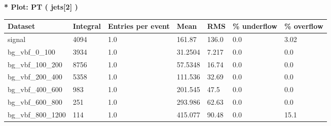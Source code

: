 \documentclass[a4paper, 10pt]{article}
\begin{document}
\textbf{* Plot: PT ( jets[2] ) }\\
   \begin{table}[H]
  \begin{center}
    \begin{tabular}{|m{23.0mm}|m{23.0mm}|m{18.0mm}|m{19.0mm}|m{19.0mm}|m{19.0mm}|m{19.0mm}|}
      \hline
      {\cellcolor{yellow}         Dataset}& {\cellcolor{yellow}         Integral}& {\cellcolor{yellow}         Entries per event}& {\cellcolor{yellow}         Mean}& {\cellcolor{yellow}         RMS}& {\cellcolor{yellow}         \% underflow}& {\cellcolor{yellow}         \% overflow}\\
      \hline
      {\cellcolor{white}         signal}& {\cellcolor{white}         4094}& {\cellcolor{white}         1.0}& {\cellcolor{white}         161.87}& {\cellcolor{white}         136.0}& {\cellcolor{green}         0.0}& {\cellcolor{green}         3.02}\\
      \hline
      {\cellcolor{white}         bg\_vbf\_0\_100}& {\cellcolor{white}         3934}& {\cellcolor{white}         1.0}& {\cellcolor{white}         31.2504}& {\cellcolor{white}         7.217}& {\cellcolor{green}         0.0}& {\cellcolor{green}         0.0}\\
      \hline
      {\cellcolor{white}         bg\_vbf\_100\_200}& {\cellcolor{white}         8756}& {\cellcolor{white}         1.0}& {\cellcolor{white}         57.5348}& {\cellcolor{white}         16.74}& {\cellcolor{green}         0.0}& {\cellcolor{green}         0.0}\\
      \hline
      {\cellcolor{white}         bg\_vbf\_200\_400}& {\cellcolor{white}         5358}& {\cellcolor{white}         1.0}& {\cellcolor{white}         111.536}& {\cellcolor{white}         32.69}& {\cellcolor{green}         0.0}& {\cellcolor{green}         0.0}\\
      \hline
      {\cellcolor{white}         bg\_vbf\_400\_600}& {\cellcolor{white}         983}& {\cellcolor{white}         1.0}& {\cellcolor{white}         201.545}& {\cellcolor{white}         47.5}& {\cellcolor{green}         0.0}& {\cellcolor{green}         0.0}\\
      \hline
      {\cellcolor{white}         bg\_vbf\_600\_800}& {\cellcolor{white}         251}& {\cellcolor{white}         1.0}& {\cellcolor{white}         293.986}& {\cellcolor{white}         62.63}& {\cellcolor{green}         0.0}& {\cellcolor{green}         0.0}\\
      \hline
      {\cellcolor{white}         bg\_vbf\_800\_1200}& {\cellcolor{white}         114}& {\cellcolor{white}         1.0}& {\cellcolor{white}         415.077}& {\cellcolor{white}         90.48}& {\cellcolor{red}         0.0}& {\cellcolor{red}         15.1}\\

\end{tabular}
\end{center}
\end{table}
\end{document}
